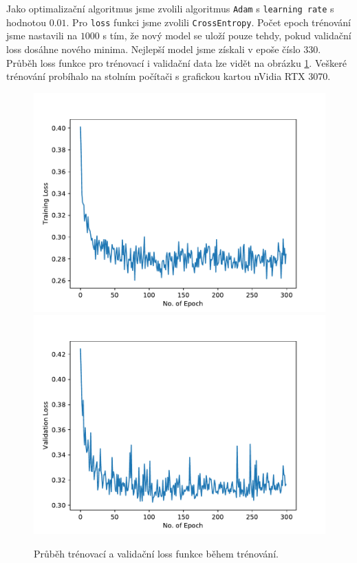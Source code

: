 \documentclass[a4paper,11pt]{article}
\begin{document}
		Jako optimalizační algoritmus jsme zvolili algoritmus \texttt{Adam} s \texttt{learning rate} s hodnotou $0.01$. Pro \texttt{loss} funkci jsme zvolili \texttt{CrossEntropy}. Počet epoch trénování jsme nastavili na $1000$ s tím, že nový model se uloží pouze tehdy, pokud validační loss dosáhne nového minima. Nejlepší model jsme získali v epoše číslo $330$. Průběh loss funkce pro trénovací i validační data lze vidět na obrázku \ref{fig:loss}. Veškeré trénování probíhalo na stolním počítači s grafickou kartou nVidia RTX 3070.
		
		\begin{figure}[h]
			\label{fig:loss}
			\centering
			\includegraphics[scale=0.5]{training_loss.pdf}
			\includegraphics[scale=0.5]{valid_loss.pdf}
			\caption{Průběh trénovací a validační loss funkce během trénování.}
		\end{figure}
	
\end{document}
